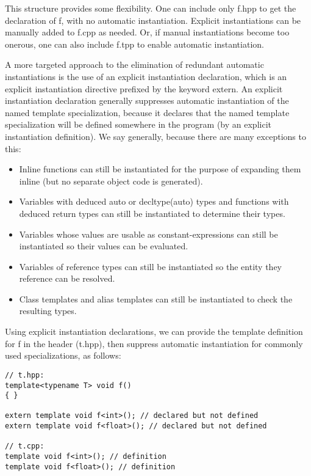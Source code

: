 This structure provides some flexibility. One can include only f.hpp to get the declaration of f, with no automatic instantiation. Explicit instantiations can be manually added to f.cpp as needed. Or, if manual instantiations become too onerous, one can also include f.tpp to enable automatic instantiation.


A more targeted approach to the elimination of redundant automatic instantiations is the use of an explicit instantiation declaration, which is an explicit instantiation directive prefixed by the keyword extern. An explicit instantiation declaration generally suppresses automatic instantiation of the named template specialization, because it declares that the named template specialization will be defined somewhere in the program (by an explicit instantiation definition). We say generally, because there are many exceptions to this:

\begin{itemize}
\item 
Inline functions can still be instantiated for the purpose of expanding them inline (but no separate object code is generated).

\item 
Variables with deduced auto or decltype(auto) types and functions with deduced return types can still be instantiated to determine their types.

\item 
Variables whose values are usable as constant-expressions can still be instantiated so their values can be evaluated.

\item 
Variables of reference types can still be instantiated so the entity they reference can be resolved.

\item 
Class templates and alias templates can still be instantiated to check the resulting types.
\end{itemize}

Using explicit instantiation declarations, we can provide the template definition for f in the header (t.hpp), then suppress automatic instantiation for commonly used specializations, as follows:

\begin{lstlisting}[style=styleCXX]
// t.hpp:
template<typename T> void f()
{ }

extern template void f<int>(); // declared but not defined
extern template void f<float>(); // declared but not defined

// t.cpp:
template void f<int>(); // definition
template void f<float>(); // definition
\end{lstlisting}

